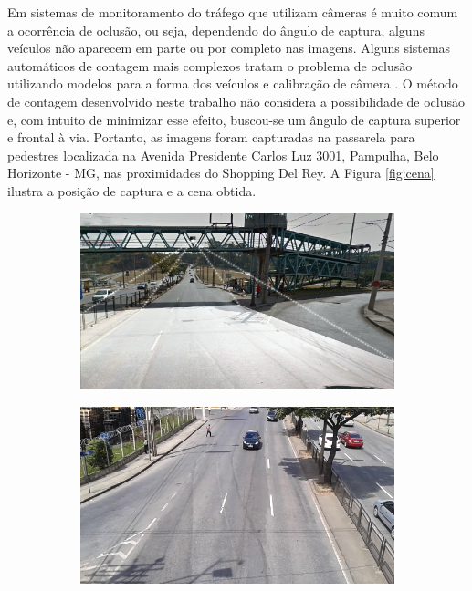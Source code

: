 Em sistemas de monitoramento do tráfego que utilizam câmeras é muito comum a ocorrência de oclusão, ou seja, dependendo do ângulo de captura, alguns veículos não aparecem em parte ou por completo nas imagens. Alguns sistemas automáticos de contagem mais complexos tratam o problema de oclusão utilizando modelos para a forma dos veículos e calibração de câmera \citep{song:2005}. O método de contagem desenvolvido neste trabalho não considera a possibilidade de oclusão e, com intuito de minimizar esse efeito, buscou-se um ângulo de captura superior e frontal à via. Portanto, as imagens foram capturadas na passarela para pedestres localizada na Avenida Presidente Carlos Luz 3001, Pampulha, Belo Horizonte - MG, nas proximidades do Shopping Del Rey. A Figura \ref{fig:cena} ilustra a posição de captura e a cena obtida.

\begin{figure}[ht]
  \begin{center}
    \begin{subfigure}[b]{.49\textwidth}
      \begin{center}
        \includegraphics[width=1\linewidth]{imgs/cena_captura.png}
      \end{center}
      \caption{}
      \label{fig:cena_captura}
    \end{subfigure}
    \begin{subfigure}[b]{.49\textwidth}
      \begin{center}
        \includegraphics[width=1\linewidth]{imgs/original_frame.png}

\end{center}
\end{subfigure}
\end{center}
\end{figure}
